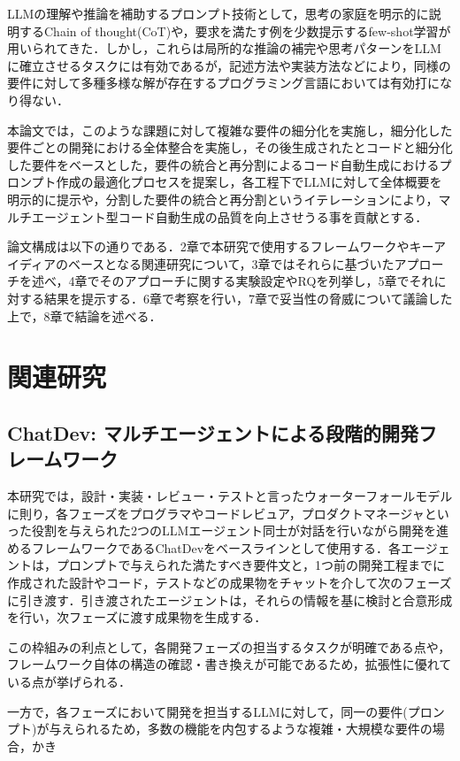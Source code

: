 \documentclass[submit,techrep,noauthor]{ipsj}
\begin{document}
LLMの理解や推論を補助するプロンプト技術として，思考の家庭を明示的に説明するChain of thought(CoT)や，要求を満たす例を少数提示するfew-shot学習が用いられてきた．しかし，これらは局所的な推論の補完や思考パターンをLLMに確立させるタスクには有効であるが，記述方法や実装方法などにより，同様の要件に対して多種多様な解が存在するプログラミング言語においては有効打になり得ない．

本論文では，このような課題に対して複雑な要件の細分化を実施し，細分化した要件ごとの開発における全体整合を実施し，その後生成されたとコードと細分化した要件をベースとした，要件の統合と再分割によるコード自動生成におけるプロンプト作成の最適化プロセスを提案し，各工程下でLLMに対して全体概要を明示的に提示や，分割した要件の統合と再分割というイテレーションにより，マルチエージェント型コード自動生成の品質を向上させうる事を貢献とする．

論文構成は以下の通りである．2章で本研究で使用するフレームワークやキーアイディアのベースとなる関連研究について，3章ではそれらに基づいたアプローチを述べ，4章でそのアプローチに関する実験設定やRQを列挙し，5章でそれに対する結果を提示する．6章で考察を行い，7章で妥当性の脅威について議論した上で，8章で結論を述べる．

\section{関連研究}
\label{sec:format}

\subsection{ChatDev: マルチエージェントによる段階的開発フレームワーク}
本研究では，設計・実装・レビュー・テストと言ったウォーターフォールモデルに則り，各フェーズをプログラマやコードレビュア，プロダクトマネージャといった役割を与えられた2つのLLMエージェント同士が対話を行いながら開発を進めるフレームワークであるChatDev\cite{qian-etal-2024-chatdev}をベースラインとして使用する．各エージェントは，プロンプトで与えられた満たすべき要件文と，1つ前の開発工程までに作成された設計やコード，テストなどの成果物をチャットを介して次のフェーズに引き渡す．引き渡されたエージェントは，それらの情報を基に検討と合意形成を行い，次フェーズに渡す成果物を生成する．

この枠組みの利点として，各開発フェーズの担当するタスクが明確である点や，フレームワーク自体の構造の確認・書き換えが可能であるため，拡張性に優れている点が挙げられる．

一方で，各フェーズにおいて開発を担当するLLMに対して，同一の要件(プロンプト)が与えられるため，多数の機能を内包するような複雑・大規模な要件の場合，かき
\end{document}
